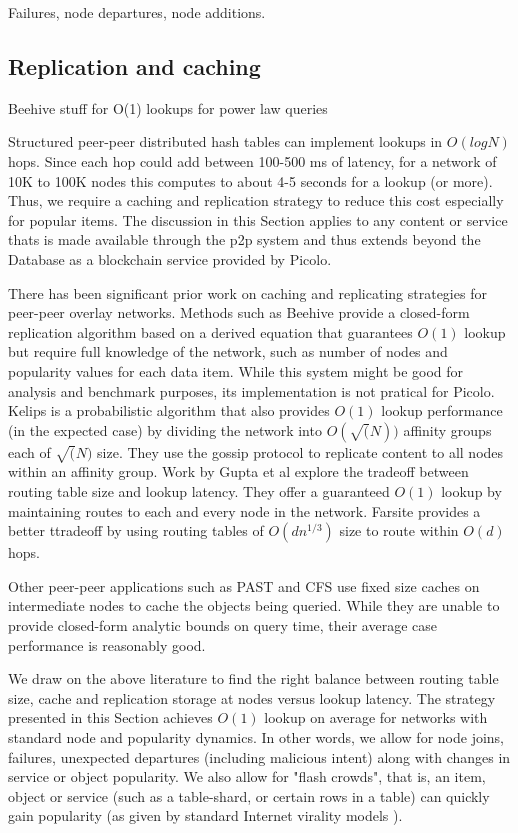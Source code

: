 Failures, node departures, node additions.

\subsection{Replication and caching}
Beehive stuff for O(1) lookups for power law queries

Structured peer-peer distributed hash tables can implement lookups in \( O(log N)\) hops. Since each hop could add between 100-500
ms of latency, for a network of 10K to 100K nodes this computes to about 4-5 seconds for a lookup (or more). Thus, we
require a caching and replication strategy to reduce this cost especially for popular items. The discussion in this
Section applies to any content or service thats is made available through the p2p system and thus extends beyond the
Database as a blockchain service provided by Picolo.

There has been significant prior work on caching and replicating strategies for peer-peer overlay networks. Methods such
as Beehive \cite{beehive} provide a closed-form replication algorithm based on a derived equation that guarantees
\(O(1)\) lookup but require full knowledge of the network, such as number of nodes and popularity values for each data
item. While this system might be good for analysis and benchmark purposes, its implementation is not pratical for
Picolo. Kelips \cite{kelips} is a probabilistic algorithm that also provides \(O(1)\) lookup performance (in the
expected case) by dividing the network into \(O(\sqrt(N))\) affinity groups each of \(\sqrt(N)\) size. They use the
gossip protocol to replicate content to all nodes within an affinity group. Work by Gupta et al \cite{one_hop_lookup}
explore the tradeoff between routing table size and lookup latency. They offer a guaranteed \(O(1)\) lookup by
maintaining routes to each and every node in the network. Farsite \cite{farsite} provides a better ttradeoff by using
routing tables of \(O(dn^{1/3})\) size to route within \(O(d)\) hops.

Other peer-peer applications such as PAST \cite{past} and CFS \cite{cfs} use fixed size caches on intermediate nodes to
cache the objects being queried. While they are unable to provide closed-form analytic bounds on query time, their
average case performance is reasonably good.

We draw on the above literature to find the right balance between routing table size, cache and replication storage at
nodes versus lookup latency. The strategy presented in this Section achieves \(O(1)\) lookup on average for networks with standard node
and popularity dynamics. In other words, we allow for node joins, failures, unexpected departures (including malicious
intent) along with changes in service or object popularity. We also allow for "flash crowds", that is, an item, object
or service (such as a table-shard, or certain rows in a table) can quickly gain popularity (as given by standard
Internet virality models \cite{virality_model}).


